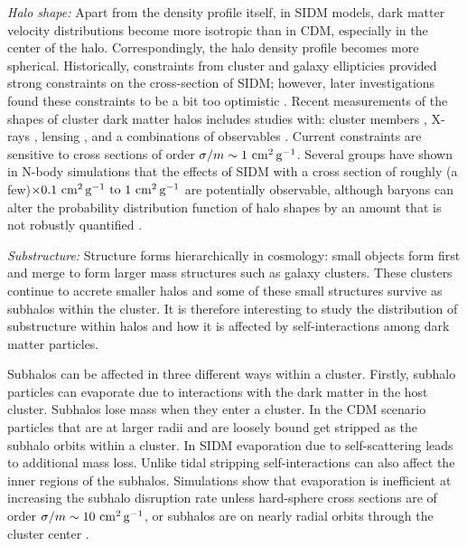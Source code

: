 \emph{Halo shape: }Apart from the density profile itself, in SIDM models, dark matter velocity distributions become more isotropic than in CDM, especially in the center of the halo.  Correspondingly,  the halo density profile becomes more spherical.  Historically, constraints from cluster and galaxy ellipticies \citep{Miralde-Escuda:2000} provided strong constraints on the cross-section of SIDM; however, later investigations found these constraints to be a bit too optimistic \citep{Peter:2013}. 
Recent measurements of the shapes of cluster dark matter halos includes studies with: cluster members \citep{2018MNRAS.475.2421S},  X-rays \citep{Hashimoto:2007},  lensing \citep{Mandelbaum:2006, Evans:2009, Oguri:2010}, and a combinations of observables \citep{Clampitt:2016, Sereno:2018}.  
Current constraints are sensitive to cross sections of order $\sigma / m \sim 1 \mathrm{\,\mathrm{\,cm}^2\mathrm{\,g}^{-1}}$.
Several groups have shown in N-body simulations that the effects of SIDM with a cross section of roughly (a few)$\times 0.1 \mathrm{\,\mathrm{\,cm}^2\mathrm{\,g}^{-1}} \hbox{ to } 1 \mathrm{\,\mathrm{\,cm}^2\mathrm{\,g}^{-1}}$ are potentially observable, although baryons can alter the probability distribution function of halo shapes by an amount that is not robustly quantified \citep[\eg][]{Peter:2013, Robertson:2018, Brinckmann:2018}.





\emph{Substructure: }Structure forms hierarchically in cosmology: small objects form first and merge to form larger mass structures such as galaxy clusters. These clusters continue to accrete smaller halos and some of these small structures survive as subhalos within the cluster. It is therefore interesting to study the distribution of substructure within halos and how it is affected by self-interactions among dark matter particles. 

Subhalos can be affected in three different ways within a cluster. Firstly, subhalo particles can evaporate due to interactions with the dark matter in the host cluster. Subhalos lose mass when they enter a cluster. In the CDM scenario particles that are at larger radii and are loosely bound get stripped as the subhalo orbits within a cluster. In SIDM evaporation due to self-scattering leads to additional mass loss. Unlike tidal stripping self-interactions can also affect the inner regions of the subhalos. Simulations show that evaporation is inefficient at increasing the subhalo disruption rate unless hard-sphere cross sections are of order $\sigma/m\sim 10\mathrm{\,\mathrm{\,cm}^2\mathrm{\,g}^{-1}}$, or subhalos are on nearly radial orbits through the cluster center \citep{2012MNRAS.423.3740V,Rocha:2012jg,Dooley:2016ajo}. 

